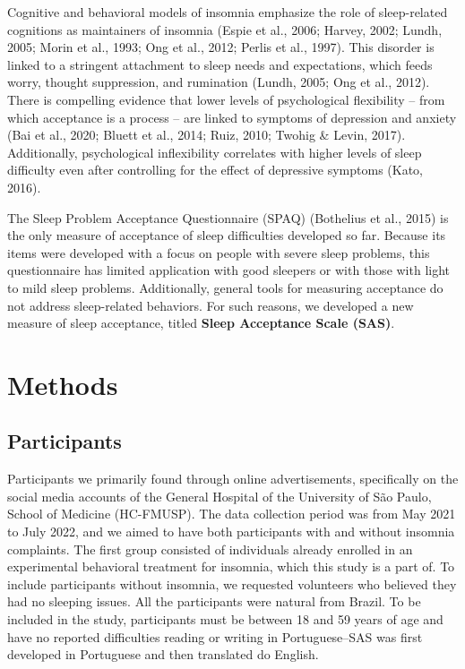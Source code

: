 \documentclass[
  letterpaper,
  DIV=11,
  numbers=noendperiod]{scrreprt}
\begin{document}
Cognitive and behavioral models of insomnia emphasize the role of
sleep-related cognitions as maintainers of insomnia (Espie et al., 2006;
Harvey, 2002; Lundh, 2005; Morin et al., 1993; Ong et al., 2012; Perlis
et al., 1997). This disorder is linked to a stringent attachment to
sleep needs and expectations, which feeds worry, thought suppression,
and rumination (Lundh, 2005; Ong et al., 2012). There is compelling
evidence that lower levels of psychological flexibility -- from which
acceptance is a process -- are linked to symptoms of depression and
anxiety (Bai et al., 2020; Bluett et al., 2014; Ruiz, 2010; Twohig \&
Levin, 2017). Additionally, psychological inflexibility correlates with
higher levels of sleep difficulty even after controlling for the effect
of depressive symptoms (Kato, 2016).

The Sleep Problem Acceptance Questionnaire (SPAQ) (Bothelius et al.,
2015) is the only measure of acceptance of sleep difficulties developed
so far. Because its items were developed with a focus on people with
severe sleep problems, this questionnaire has limited application with
good sleepers or with those with light to mild sleep problems.
Additionally, general tools for measuring acceptance do not address
sleep-related behaviors. For such reasons, we developed a new measure of
sleep acceptance, titled \textbf{Sleep Acceptance Scale (SAS)}.

\hypertarget{methods}{%
\section{Methods}\label{methods}}

\hypertarget{participants}{%
\subsection{Participants}\label{participants}}

Participants we primarily found through online advertisements,
specifically on the social media accounts of the General Hospital of the
University of São Paulo, School of Medicine (HC-FMUSP). The data
collection period was from May 2021 to July 2022, and we aimed to have
both participants with and without insomnia complaints. The first group
consisted of individuals already enrolled in an experimental behavioral
treatment for insomnia, which this study is a part of. To include
participants without insomnia, we requested volunteers who believed they
had no sleeping issues. All the participants were natural from Brazil.
To be included in the study, participants must be between 18 and 59
years of age and have no reported difficulties reading or writing in
Portuguese--SAS was first developed in Portuguese and then translated do
English.
\end{document}
